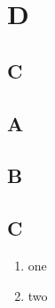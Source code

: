\documentclass[12pt]{article}
\begin{document}
\newpage
\section{D}
\subsection{C}
\subsection{A}
\subsection{B}
\subsection{C}

\begin{enumerate}
	\item one
	\item two
\end{enumerate}
\end{document}
